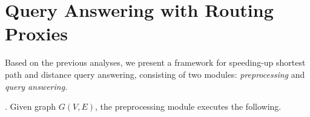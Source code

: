 \section{Query Answering with Routing Proxies}
\label{sec-query}



 Based on the previous analyses, we present a framework for speeding-up shortest  path and distance query answering, consisting of two modules: {\em preprocessing} and {\em query answering}.

. Given graph $G(V, E)$, the preprocessing module executes the following.

